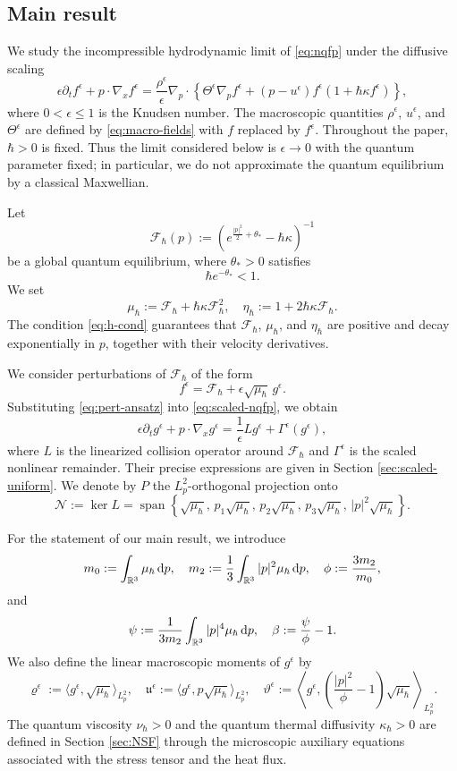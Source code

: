 \documentclass[10pt,reqno]{amsart}
\numberwithin{equation}{section}
\newcommand{\lt}{\left}
\newcommand{\rt}{\right}
\newcommand{\lal}{\langle}
\newcommand{\ral}{\rangle}
\newcommand{\mR}{\mathbb{R}}
\newcommand{\vrh}{\varrho}
\newcommand{\vth}{\vartheta}
\newcommand{\mfu}{\mathfrak{u}}
\newcommand{\intr}{\int_{\mR^3}}
\newcommand{\bq}{\begin{equation}}
\newcommand{\eq}{\end{equation}}
\newcommand{\pa}{\partial}
\newcommand{\calF}{\mathcal F}
\newcommand{\calN}{\mathcal N}
\newcommand{\rdp}{\textnormal{d}p}
\begin{document}
%
%
%
%
%
%
%
%
%
%

\subsection{Main result}


We study the incompressible hydrodynamic limit of \eqref{eq:nqfp} under the diffusive scaling
\bq\label{eq:scaled-nqfp}
\epsilon\pa_t f^\epsilon+p\cdot\nabla_x f^\epsilon = \frac{\rho^\epsilon}{\epsilon}
\nabla_p\cdot\lt\{\Theta^\epsilon\nabla_p f^\epsilon+(p-u^\epsilon)f^\epsilon(1+\hbar\kappa f^\epsilon)\rt\},
\eq
where $0<\epsilon\le1$ is the Knudsen number. The macroscopic quantities $\rho^\epsilon$, $u^\epsilon$, and $\Theta^\epsilon$ are defined by \eqref{eq:macro-fields} with $f$ replaced by $f^\epsilon$. Throughout the paper, $\hbar>0$ is fixed. Thus the limit considered below is $\epsilon\to0$ with the quantum parameter fixed; in particular, we do not approximate the quantum equilibrium by a classical Maxwellian.

Let
\[
\calF_\hbar(p):=\lt(e^{\frac{|p|^2}{2}+\theta_*}-\hbar\kappa\rt)^{-1}
\]
be a global quantum equilibrium, where $\theta_*>0$ satisfies
\bq\label{eq:h-cond}
\hbar e^{-\theta_*}<1.
\eq
We set
\[
\mu_\hbar:=\calF_\hbar+\hbar\kappa\calF_\hbar^2,\quad \eta_\hbar:=1+2\hbar\kappa\calF_\hbar.
\]
The condition \eqref{eq:h-cond} guarantees that $\calF_\hbar$, $\mu_\hbar$, and $\eta_\hbar$ are positive and decay exponentially in $p$, together with their velocity derivatives.

We consider perturbations of $\calF_\hbar$ of the form
\bq\label{eq:pert-ansatz}
f^\epsilon=\calF_\hbar+\epsilon\sqrt{\mu_\hbar}\,g^\epsilon.
\eq
Substituting \eqref{eq:pert-ansatz} into \eqref{eq:scaled-nqfp}, we obtain
\bq\label{eq:pert-eq}
\epsilon\pa_t g^\epsilon+p\cdot\nabla_x g^\epsilon = \frac{1}{\epsilon}Lg^\epsilon+\Gamma^\epsilon(g^\epsilon),
\eq
where $L$ is the linearized collision operator around $\calF_\hbar$ and $\Gamma^\epsilon$ is the scaled nonlinear remainder. Their precise expressions are given in Section \ref{sec:scaled-uniform}. We denote by $P$ the $L^2_p$-orthogonal projection onto
\[
\calN:=\ker L = \operatorname{span}\lt\{ \sqrt{\mu_\hbar},\,p_1\sqrt{\mu_\hbar},\,p_2\sqrt{\mu_\hbar},\,p_3\sqrt{\mu_\hbar},\,|p|^2\sqrt{\mu_\hbar} \rt\}.
\]

For the statement of our main result, we introduce
\bq\label{eq:mom-h}
m_0:=\intr \mu_\hbar\,\rdp,\quad m_2:=\frac13\intr |p|^2\mu_\hbar\,\rdp,\quad \phi:=\frac{3m_2}{m_0},
\eq
and
\[
\psi:=\frac{1}{3m_2}\intr |p|^4\mu_\hbar\,\rdp,\quad \beta:=\frac{\psi}{\phi}-1.
\]
We also define the linear macroscopic moments of $g^\epsilon$ by
\[
\vrh^\epsilon:=\lal g^\epsilon,\sqrt{\mu_\hbar}\ral_{L^2_p},\quad
\mfu^\epsilon:=\lal g^\epsilon,p\sqrt{\mu_\hbar}\ral_{L^2_p},\quad
\vth^\epsilon:=\lt\lal g^\epsilon,\lt(\frac{|p|^2}{\phi}-1\rt)\sqrt{\mu_\hbar}\rt\ral_{L^2_p}.
\]
The quantum viscosity $\nu_\hbar>0$ and the quantum thermal diffusivity $\kappa_\hbar>0$ are defined in Section \ref{sec:NSF} through the microscopic auxiliary equations associated with the stress tensor and the heat flux.
 
\end{document}
